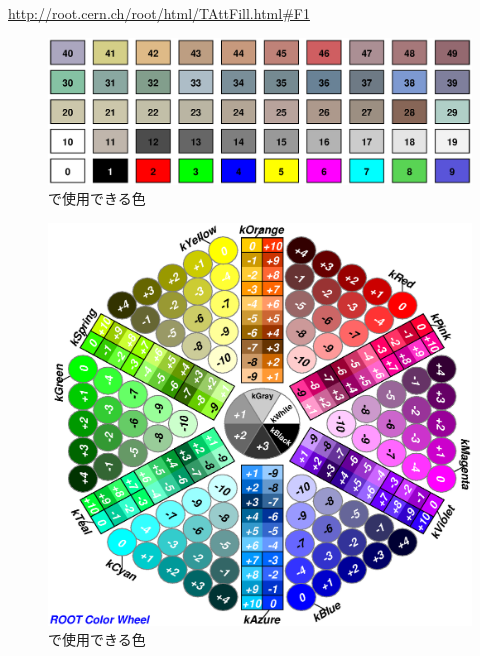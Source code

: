 \documentclass{jarticle}
\begin{document}
 \url{http://root.cern.ch/root/html/TAttFill.html#F1}
 \begin{figure}[htbp]
  \begin{center}
   \includegraphics[width = 140mm]{./picture/filareacolor.eps}
  \end{center}
  \caption{\ROOT で使用できる色}
  \label{Fig:filareacolor}
 \end{figure}

 \begin{figure}[htbp]
  \begin{center}
   \includegraphics[width = 140mm]{./picture/rootcolorwheel.eps}
  \end{center}
  \caption{\ROOT で使用できる色}
  \label{Fig:rootcolorwheel}
 \end{figure}

\end{document}
